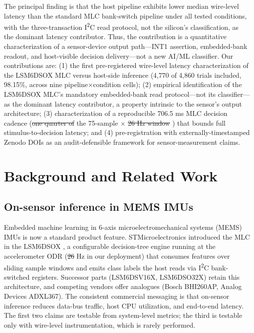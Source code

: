 \documentclass{IEEE_lsens}
\providecommand{\DIFadd}[1]{{\protect\color{blue}\uwave{#1}}} %
\providecommand{\DIFdel}[1]{{\protect\color{red}\sout{#1}}}                      %
\providecommand{\DIFaddbegin}{} %
\providecommand{\DIFaddend}{} %
\providecommand{\DIFdelbegin}{} %
\providecommand{\DIFdelend}{} %
\newcommand{\DIFscaledelfig}{0.5}
\newlength{\DIFdelgraphicswidth} %
\newlength{\DIFdelgraphicsheight} %
\newcommand{\DIFaddincludegraphics}[2][]{{\color{blue}\fbox{\DIFOincludegraphics[#1]{#2}}}} %
\newcommand{\DIFdelincludegraphics}[2][]{%
\sbox{\DIFdelgraphicsbox}{\DIFOincludegraphics[#1]{#2}}%
\settoboxwidth{\DIFdelgraphicswidth}{\DIFdelgraphicsbox} %
\settoboxtotalheight{\DIFdelgraphicsheight}{\DIFdelgraphicsbox} %
\scalebox{\DIFscaledelfig}{%
\parbox[b]{\DIFdelgraphicswidth}{\usebox{\DIFdelgraphicsbox}\\[-\baselineskip] \rule{\DIFdelgraphicswidth}{0em}}\llap{\resizebox{\DIFdelgraphicswidth}{\DIFdelgraphicsheight}{%
\setlength{\unitlength}{\DIFdelgraphicswidth}%
\begin{picture}(1,1)%
\thicklines\linethickness{2pt} %
{\color[rgb]{1,0,0}\put(0,0){\framebox(1,1){}}}%
{\color[rgb]{1,0,0}\put(0,0){\line( 1,1){1}}}%
{\color[rgb]{1,0,0}\put(0,1){\line(1,-1){1}}}%
\end{picture}%
}\hspace*{3pt}}} %
} %
\DeclareRobustCommand{\DIFaddbegin}{\DIFOaddbegin \let\includegraphics\DIFaddincludegraphics} %
\DeclareRobustCommand{\DIFaddend}{\DIFOaddend \let\includegraphics\DIFOincludegraphics} %
\DeclareRobustCommand{\DIFdelbegin}{\DIFOdelbegin \let\includegraphics\DIFdelincludegraphics} %
\DeclareRobustCommand{\DIFdelend}{\DIFOaddend \let\includegraphics\DIFOincludegraphics} %
\begin{document}
The principal finding is that the host pipeline exhibits lower median wire-level latency than the standard MLC bank-switch pipeline under all tested conditions, with the three-transaction I\textsuperscript{2}C read protocol, not the silicon's classification, as the dominant latency contributor. Thus, the contribution is a quantitative characterization of a sensor-device output path---INT1 assertion, embedded-bank readout, and host-visible decision delivery---not a new AI/ML classifier. Our contributions are: (1) the first pre-registered wire-level latency characterization of the LSM6DSOX MLC versus host-side inference (4,770 of 4,860 trials included, 98.15\%, across nine pipeline$\times$condition cells); (2) empirical identification of the LSM6DSOX MLC's mandatory embedded-bank read protocol---not its classifier---as the dominant latency contributor, a property intrinsic to the sensor's output architecture; (3) characterization of a reproducible 706.5 ms MLC decision cadence (\DIFdelbegin \DIFdel{one quarter of }\DIFdelend the 75-sample $\times$ \DIFdelbegin \DIFdel{26 Hz window }\DIFdelend \DIFaddbegin \DIFadd{104 Hz window period}\DIFaddend ) that bounds full stimulus-to-decision latency; and (4) pre-registration with externally-timestamped Zenodo DOIs as an audit-defensible framework for sensor-measurement claims.


\section{Background and Related Work}

\subsection{On-sensor inference in MEMS IMUs}

Embedded machine learning in 6-axis microelectromechanical systems (MEMS) IMUs is now a standard product feature. STMicroelectronics introduced the MLC in the LSM6DSOX \cite{ref2}, a configurable decision-tree engine running at the accelerometer ODR (\DIFdelbegin \DIFdel{26 }\DIFdelend \DIFaddbegin \DIFadd{104 }\DIFaddend Hz in our deployment) that consumes features over sliding sample windows and emits class labels the host reads via I\textsuperscript{2}C bank-switched registers. Successor parts (LSM6DSV16X, LSM6DSO32X) retain this architecture, and competing vendors offer analogues (Bosch BHI260AP, Analog Devices ADXL367). The consistent commercial messaging is that on-sensor inference reduces data-bus traffic, host CPU utilization, and end-to-end latency. The first two claims are testable from system-level metrics; the third is testable only with wire-level instrumentation, which is rarely performed.
\end{document}
